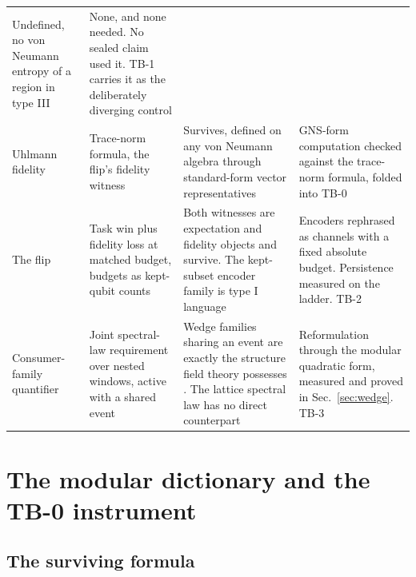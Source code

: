 \documentclass[aps,prd,reprint,nofootinbib,longbibliography]{revtex4-2}
\begin{document}
\begin{table}[t]
\begin{ruledtabular}
\begin{tabular}{p{}p{}p{}p{}}
Undefined, no von Neumann entropy of a region in type III
\cite{Witten2018} &
None, and none needed.  No sealed claim used it.  TB-1 carries it as the
deliberately diverging control \\
Uhlmann fidelity &
Trace-norm formula, the flip's fidelity witness &
Survives, defined on any von Neumann algebra through standard-form vector
representatives &
GNS-form computation checked against the trace-norm formula, folded into
TB-0 \\
The flip &
Task win plus fidelity loss at matched budget, budgets as kept-qubit
counts &
Both witnesses are expectation and fidelity objects and survive.  The
kept-subset encoder family is type I language &
Encoders rephrased as channels with a fixed absolute budget.  Persistence
measured on the ladder.  TB-2 \\
Consumer-family quantifier &
Joint spectral-law requirement over nested windows, active with a shared
event &
Wedge families sharing an event are exactly the structure field theory
possesses \cite{Witten2018}.  The lattice spectral law has no direct
counterpart &
Reformulation through the modular quadratic form, measured and proved in
Sec.~\ref{sec:wedge}.  TB-3 \\
\end{tabular}
\end{ruledtabular}
\end{table}

\section{The modular dictionary and the TB-0 instrument}
\label{sec:modular}

\subsection{The surviving formula}
\end{document}
